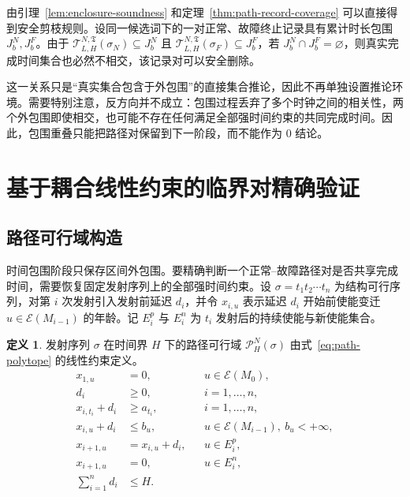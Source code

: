\documentclass[master,fontset=ubuntu]{shnuthesis}
\DeclareRobustCommand{\logicstatus}[1]{\ensuremath{#1}}
\theoremstyle{definition}
\newtheorem{thesisdefinition}{定义}
\begin{document}
由引理~\ref{lem:enclosure-soundness} 和定理~\ref{thm:path-record-coverage} 可以直接得到安全剪枝规则。设同一候选词下的一对正常、故障终止记录具有累计时长包围 \(J_b^N,J_b^F\)。由于 \(\mathcal T_{L,H}^{N,\mathfrak T}(\sigma_N)\subseteq J_b^N\) 且 \(\mathcal T_{L,H}^{N,\mathfrak T}(\sigma_F)\subseteq J_b^F\)，若 \(J_b^N\cap J_b^F=\varnothing\)，则真实完成时间集合也必然不相交，该记录对可以安全删除。

这一关系只是“真实集合包含于外包围”的直接集合推论，因此不再单独设置推论环境。需要特别注意，反方向并不成立：包围过程丢弃了多个时钟之间的相关性，两个外包围即使相交，也可能不存在任何满足全部强时间约束的共同完成时间。因此，包围重叠只能把路径对保留到下一阶段，而不能作为 \logicstatus{0} 结论。

\section{基于耦合线性约束的临界对精确验证}

\subsection{路径可行域构造}

时间包围阶段只保存区间外包围。要精确判断一个正常--故障路径对是否共享完成时间，需要恢复固定发射序列上的全部强时间约束。设 \(\sigma=t_1t_2\cdots t_n\) 为结构可行序列，对第 \(i\) 次发射引入发射前延迟 \(d_i\)，并令 \(x_{i,u}\) 表示延迟 \(d_i\) 开始前使能变迁 \(u\in\mathcal E(M_{i-1})\) 的年龄。记 \(E_i^p\) 与 \(E_i^n\) 为 \(t_i\) 发射后的持续使能与新使能集合。

\begin{thesisdefinition}
\label{def:path-polytope}
发射序列 \(\sigma\) 在时间界 \(H\) 下的路径可行域 \(\mathcal P_H^N(\sigma)\) 由式~\eqref{eq:path-polytope} 的线性约束定义。
\begin{equation}
\begin{aligned}
x_{1,u} &= 0,
&&u\in\mathcal E(M_0),\\
d_i &\geq 0,
&&i=1,\ldots,n,\\
x_{i,t_i}+d_i &\geq a_{t_i},
&&i=1,\ldots,n,\\
x_{i,u}+d_i &\leq b_u,
&&u\in\mathcal E(M_{i-1}),\ b_u<+\infty,\\
x_{i+1,u} &= x_{i,u}+d_i,
&&u\in E_i^p,\\
x_{i+1,u} &= 0,
&&u\in E_i^n,\\
\sum_{i=1}^{n}d_i &\leq H.
\end{aligned}
\label{eq:path-polytope}
\end{equation}
\end{thesisdefinition}
\end{document}
